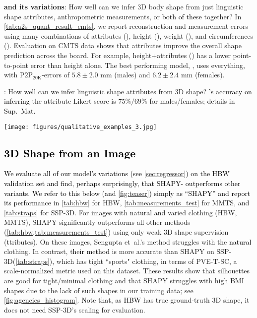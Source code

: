 \documentclass[10pt,twocolumn,letterpaper]{article}
\newcommand{\qheading}[1]{\noindent\textbf{#1}:}
\newcommand{\modelCOLOR}{black}
\newcommand{\modelname}{{\color{\modelCOLOR}SHAPY}\xspace}
\newcommand{\colorattr}{\color{PineGreen}}
\newcommand{\colorheight}{\color{Bittersweet}}
\newcommand{\colorweight}{\color{Orange}}
\newcommand{\colorcirc}{\color{OrangeRed}}
\newcommand{\colorAHWCtoS}{\text{\mbox{{\colorattr{A}}{\colorheight{H}}{\colorweight{W}}{\colorcirc{C}}}}\xspace}
\newcommand{\colorAHtoS}{\text{\mbox{{\colorattr{A}}{\colorheight{H}}2S}}\xspace}
\newcommand{\AtoS}{\text{\mbox{A2S}}\xspace}
\newcommand{\StoA}{\text{\mbox{S2A}}\xspace}
\newcommand{\shapyA}{\mbox{\modelname-{\colorattr{A}}}\xspace}
\newcommand{\threeD}{3D\xspace}
\newcommand{\mmts}{MMTS\xspace}
\newcommand{\cmts}{CMTS\xspace}
\newcommand{\ssp}{\mbox{SSP-\threeD}\xspace}
\newcommand{\hbw}{\mbox{HBW}\xspace}
\newcommand{\bmi}{\mbox{BMI}\xspace}
\newcommand{\supmat}{{\mbox{\textcolor{black}{Sup.~Mat.}}}\xspace}
\renewcommand{\etal}{\mbox{et al.}\xspace}
\newcommand{\vtovHD}{\mbox{$\text{P2P}_{20\text{K}}$}\xspace}
\newcommand{\rgb}{\mbox{RGB}\xspace}
\newcommand{\cameraready}[1]{\textcolor{Fuchsia}{{#1}}\xspace}
\renewcommand{\cameraready}[1]{\textcolor{black}{{#1}}\xspace}
\newcommand{\colorTERM}{blue}
\renewcommand{\colorTERM}{black}
\newcommand{\measurements}[0]{{\color{\colorTERM}anthropometric measurements}\xspace}
\newcommand{\linguisticshapeattributes}[0]{{\color{\colorTERM}linguistic shape attributes}\xspace}
\begin{document}
\qheading{\AtoS and its variations}
How well can we infer \threeD body shape from just \linguisticshapeattributes, \measurements, or \cameraready{both of these}
together?
In \cref{tab:a2s_quant_result_cmts}, we report reconstruction and measurement errors using many combinations of 
attributes      ({\colorattr{A}}), 
height          ({\colorheight{H}}), 
weight          ({\colorweight{W}}), and 
circumferences  ({\colorcirc{C}}).
Evaluation on \cmts data shows that attributes improve the overall shape prediction across the board. 
For example, height+attributes (\colorAHtoS) has a lower point-to-point error than height alone. 
The best performing model, \colorAHWCtoS, uses everything, with \vtovHD-errors of 
$5.8 \pm 2.0$ mm (males) and 
$6.2 \pm 2.4$ mm (females). 

\smallskip
\qheading{\StoA}
How well can we infer \linguisticshapeattributes from \threeD shape?
\cameraready{\StoA's accuracy on inferring} the attribute Likert score is
$75\%/69\%$ for males/females; details in \supmat


\begin{figure*}
    \centering
    \texttt{[image: figures/qualitative\_examples\_3.jpg]}
	\caption{Qualitative results from \hbw. 
    From left to right: \rgb,  ground-truth shape,
    \modelname and Sengupta \etal \cite{sengupta2021hierarchicalICCV}.
    \cameraready{For example, in the upper- and lower- right images, \modelname is less affected by pose variation and loose clothing.}
    }
\label{fig:resultimages}
\end{figure*} 

\subsection{\cameraready{\threeD Shape from an Image}}


\cameraready{We evaluate all of our model's variations (see \cref{sec:regressor}) on the \hbw validation set and find, perhaps surprisingly, that \shapyA outperforms other variants}. 
\cameraready{We refer to this below (and \cref{fig:teaser}) simply as ``\modelname'' and report its performance} in \cref{tab:hbw} for \hbw, \cref{tab:measurements_test} for \mmts, and \cref{tab:straps} for \ssp. 
For images with \cameraready{natural and} varied clothing (\hbw, \mmts), \modelname significantly outperforms all other methods
(\cref{tab:hbw,tab:measurements_test}) 
using only weak \threeD shape supervision ({\colorattr{A}}ttributes). 
On these images, Sengupta \etal's method \cite{sengupta2021hierarchicalICCV} struggles with the \cameraready{natural} clothing.
In contrast, \cameraready{their method} is more accurate than \modelname on \ssp (\cref{tab:straps}), which has tight ``sports" clothing, in terms of \mbox{PVE-T-SC}, a scale-normalized metric used on this dataset. 
These results show that silhouettes are good for tight/minimal clothing and that \modelname struggles with high \bmi shapes due to the lack of such shapes in our training data; see \cref{fig:agencies_histogram}.
\cameraready{Note that, as \hbw}
has true ground-truth \threeD shape, it does not need \ssp's scaling for evaluation. 
\end{document}
